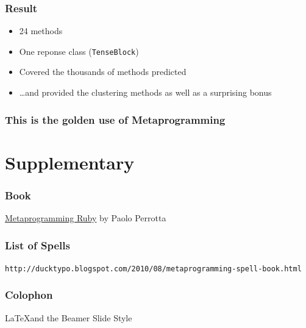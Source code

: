 \documentclass[slidestop,compress,mathserif]{beamer}
\begin{document}
\begin{frame}
	\frametitle{Result}
	\begin{itemize}
		\item 24 methods
		\item One reponse class (\texttt{TenseBlock})
		\item Covered the thousands of methods predicted
		\item \ldots and provided the clustering methods as well as a surprising bonus
	\end{itemize}
\end{frame}

\begin{frame}
	\frametitle{This is the golden use of Metaprogramming}
\end{frame}







\section{Supplementary} %
\label{sec:supplementary}

\begin{frame}
	\frametitle{Book}
	\underline{Metaprogramming Ruby} by Paolo Perrotta
\end{frame}

\begin{frame}
	\frametitle{List of Spells}
	\texttt{http://ducktypo.blogspot.com/2010/08/metaprogramming-spell-book.html}
\end{frame}

\begin{frame}
	\frametitle{Colophon}
	\LaTeX and the Beamer Slide Style
\end{frame}


\end{document}
